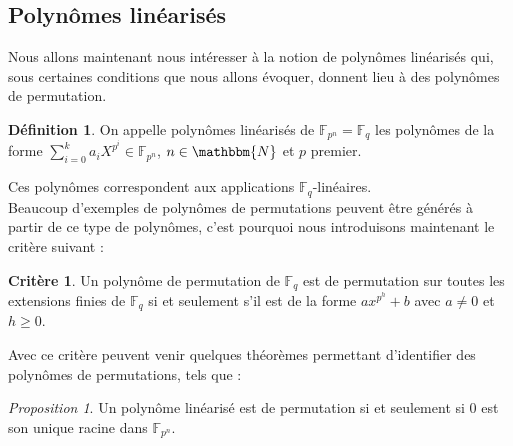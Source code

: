 \documentclass[12pt]{article}
\theoremstyle{remark}\newtheorem{note}{Note}
\theoremstyle{remark}\newtheorem{nota}{Notation}
\newtheorem{theorem}{Théorème}
\newtheorem{prop}{Proposition}
\theoremstyle{definition}
\newtheorem{definition}{Définition}
\newtheorem{crit}{Critère}
\begin{document}
\subsection{Polynômes linéarisés}
Nous allons maintenant nous intéresser à la notion de polynômes linéarisés qui, sous certaines conditions que nous allons évoquer, donnent lieu à des polynômes de permutation.\\


\begin{definition}
On appelle polynômes linéarisés de $\mathbb{F}_{p^n} = \mathbb{F}_q$ les polynômes de la forme $\displaystyle \sum_{i=0}^{k} a_iX^{p^i} \in \mathbb{F}_{p^n}$, $n \in \mathbbm{N}$ et $p$ premier.
\end{definition}
Ces polynômes correspondent aux applications $\mathbb{F}_q$-linéaires.\\
Beaucoup d'exemples de polynômes de permutations peuvent être générés à partir de ce type de polynômes, c'est pourquoi nous introduisons maintenant le critère suivant :\\
\begin{crit}
Un polynôme de permutation de $\mathbb{F}_q$ est de permutation sur toutes les extensions finies de $\mathbb{F}_q$ si et seulement s'il est de la forme $ax^{p^h} + b$ avec $a \neq 0$ et $h \geq 0$.
\end{crit}


Avec ce critère peuvent venir quelques théorèmes permettant d'identifier des polynômes de permutations, tels que :
\begin{prop}
Un polynôme linéarisé est de permutation si et seulement si $0$ est son unique racine dans $\mathbb{F}_{p^n}$.
\end{prop}
\end{document}
